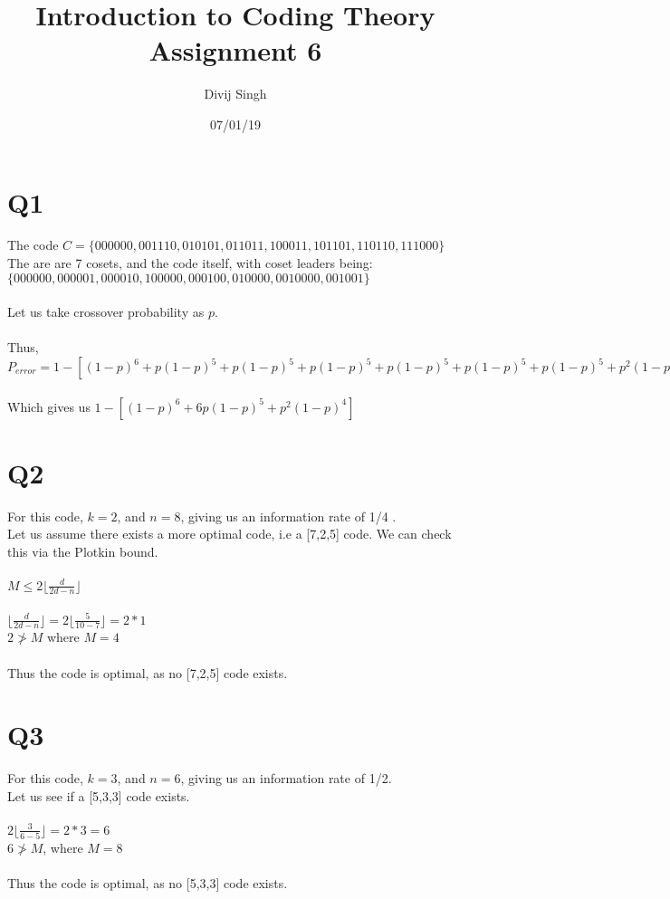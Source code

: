 \documentclass{article}
\title{Introduction to Coding Theory Assignment 6}
\author{Divij Singh}
\date{07/01/19}
\begin{document}
\section{Q1}
The code $C = \{000000, 001110, 010101, 011011, 100011, 101101, 110110, 111000\}$\\
The are are 7 cosets, and the code itself, with coset leaders being: $\{000000,000001, 000010, 100000, 000100, 010000, 0010000, 001001\}$\\\\
Let us take crossover probability as $p$.\\\\
Thus, $P_{error} = 1 - [ (1-p)^6 + p(1-p)^5 + p(1-p)^5 + p(1-p)^5 + p(1-p)^5 + p(1-p)^5 + p(1-p)^5 + p^2(1-p)^4] $\\\\
Which gives us $1 - [ (1-p)^6 + 6p(1-p)^5 + p^2(1-p)^4]$

\section{Q2}
For this code, $k=2$, and $n=8$, giving us an information rate of 1/4 .\\
Let us assume there exists a more optimal code, i.e a [7,2,5] code. We can check this via the Plotkin bound.\\\\
$M \leq 2 \lfloor \frac{d}{2d-n} \rfloor$\\
\\
$ \lfloor \frac{d}{2d-n} \rfloor = 2 \lfloor \frac{5}{10-7} \rfloor = 2 * 1$\\
$2 \ngtr M$ where $M = 4$\\\\
Thus the code is optimal, as no [7,2,5] code exists.

\section{Q3}
For this code, $k=3$, and $n=6$, giving us an information rate of 1/2.\\
Let us see if a [5,3,3] code exists.\\\\
$2 \lfloor \frac{3}{6-5} \rfloor = 2 * 3 = 6$\\
$6 \ngtr M$, where $M = 8$\\\\
Thus the code is optimal, as no [5,3,3] code exists.

	
\end{document}
